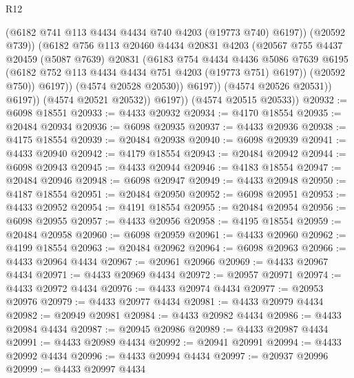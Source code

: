 \begin{lexlean}{R12}
\begin{coremodule}
                              (@6182 @741 @113 @4434 @4434 @740 @4203 (@19773 @740) @6197))
                            (@20592 @739))
                          (@6182
                            @756
                            @113
                            @20460
                            @4434
                            @20831
                            @4203
                            (@20567
                              @755
                              @4437
                              @20459
                              (@5087 @7639)
                              @20831
                              (@6183
                                @754
                                @4434
                                @4436
                                @5086
                                @7639
                                @6195
                                (@6182 @752 @113 @4434 @4434 @751 @4203 (@19773 @751) @6197))
                              (@20592 @750))
                            @6197))
                        (@4574 @20528 @20530))
                      @6197))
                  (@4574 @20526 @20531))
                @6197))
            (@4574 @20521 @20532))
          @6197))
      (@4574 @20515 @20533))
@20932 := @6098 @18551
@20933 := @4433 @20932
@20934 := @4170 @18554
@20935 := @20484 @20934
@20936 := @6098 @20935
@20937 := @4433 @20936
@20938 := @4175 @18554
@20939 := @20484 @20938
@20940 := @6098 @20939
@20941 := @4433 @20940
@20942 := @4179 @18554
@20943 := @20484 @20942
@20944 := @6098 @20943
@20945 := @4433 @20944
@20946 := @4183 @18554
@20947 := @20484 @20946
@20948 := @6098 @20947
@20949 := @4433 @20948
@20950 := @4187 @18554
@20951 := @20484 @20950
@20952 := @6098 @20951
@20953 := @4433 @20952
@20954 := @4191 @18554
@20955 := @20484 @20954
@20956 := @6098 @20955
@20957 := @4433 @20956
@20958 := @4195 @18554
@20959 := @20484 @20958
@20960 := @6098 @20959
@20961 := @4433 @20960
@20962 := @4199 @18554
@20963 := @20484 @20962
@20964 := @6098 @20963
@20966 := @4433 @20964 @4434
@20967 := @20961 @20966
@20969 := @4433 @20967 @4434
@20971 := @4433 @20969 @4434
@20972 := @20957 @20971
@20974 := @4433 @20972 @4434
@20976 := @4433 @20974 @4434
@20977 := @20953 @20976
@20979 := @4433 @20977 @4434
@20981 := @4433 @20979 @4434
@20982 := @20949 @20981
@20984 := @4433 @20982 @4434
@20986 := @4433 @20984 @4434
@20987 := @20945 @20986
@20989 := @4433 @20987 @4434
@20991 := @4433 @20989 @4434
@20992 := @20941 @20991
@20994 := @4433 @20992 @4434
@20996 := @4433 @20994 @4434
@20997 := @20937 @20996
@20999 := @4433 @20997 @4434

\end{coremodule}
\end{lexlean}
